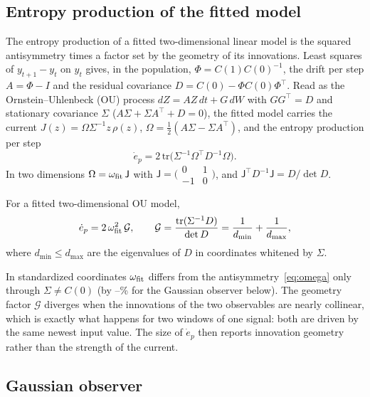 \subsection{Entropy production of the fitted model}\label{sec:factor}

The entropy production of a fitted two-dimensional linear model is the squared antisymmetry times a factor set by the geometry of its innovations. Least squares of $y_{t+1}-y_t$ on $y_t$ gives, in the population, $\Phi=C(1)C(0)^{-1}$, the drift per step $A=\Phi-I$ and the residual covariance $D=C(0)-\Phi C(0)\Phi^\top$. Read as the Ornstein--Uhlenbeck (OU) process $dZ=AZ\,dt+G\,dW$ with $GG^\top=D$ and stationary covariance $\Sigma$ ($A\Sigma+\Sigma A^\top+D=0$), the fitted model carries the current $J(z)=\Omega\Sigma^{-1}z\,\rho(z)$, $\Omega=\tfrac12(A\Sigma-\Sigma A^\top)$, and the entropy production per step \cite{seifert2012}
\begin{equation}
\dot e_p=2\,\mathrm{tr}\big(\Sigma^{-1}\Omega^\top D^{-1}\Omega\big).\label{eq:ep}
\end{equation}
In two dimensions $\Omega=\omega_{\rm fit}\,\mathsf J$ with $\mathsf J=\bigl(\begin{smallmatrix}0&1\\-1&0\end{smallmatrix}\bigr)$, and $\mathsf J^\top D^{-1}\mathsf J=D/\det D$.

\begin{proposition}[Factorization]\label{prop:factor}
For a fitted two-dimensional OU model,
\begin{equation}
\dot e_p=2\,\omega_{\rm fit}^2\,\mathcal G,\qquad
\mathcal G=\frac{\mathrm{tr}(\Sigma^{-1}D)}{\det D}=\frac{1}{d_{\min}}+\frac{1}{d_{\max}},\label{eq:factor}
\end{equation}
where $d_{\min}\le d_{\max}$ are the eigenvalues of $D$ in coordinates whitened by $\Sigma$.
\end{proposition}

In standardized coordinates $\omega_{\rm fit}$ differs from the antisymmetry~\eqref{eq:omega} only through $\Sigma\neq C(0)$ (by \OmFitDevLo--\OmFitDevHi\% for the Gaussian observer below). The geometry factor $\mathcal G$ diverges when the innovations of the two observables are nearly collinear, which is exactly what happens for two windows of one signal: both are driven by the same newest input value. The size of $\dot e_p$ then reports innovation geometry rather than the strength of the current.

\subsection{Gaussian observer}\label{sec:gauss}

